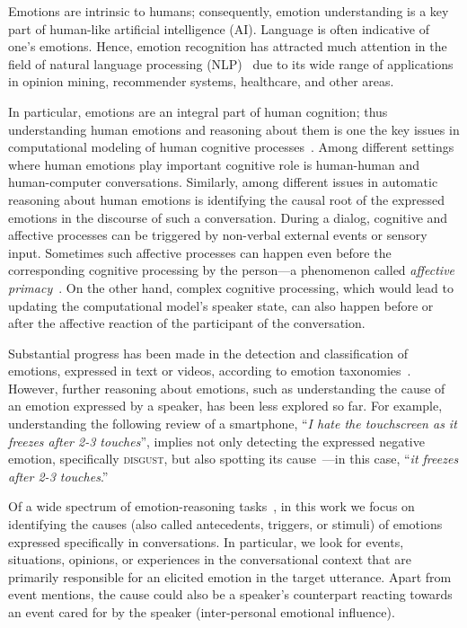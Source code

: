 \documentclass[smallextended]{svjour3}
\newcommand\emo[1]{\textsc{#1}}
\newcommand\0{\hphantom{0}}
\begin{document}
Emotions are intrinsic to humans; consequently,
emotion understanding is a key part of human-like artificial
intelligence (AI). Language is
often indicative of one's emotions. Hence, emotion recognition has attracted much attention 
in the field of natural language processing (NLP)~\citep{kratzwald2018decision, colneric2018emotion} due to its wide range of applications in
opinion mining, recommender systems, healthcare, and other areas.

In particular, emotions are an integral part of human cognition; thus understanding human emotions and reasoning about them is one the key issues in computational modeling of human cognitive processes~\citep{Izard1992}. Among different settings where human emotions play important cognitive role is human-human and human-computer conversations. Similarly, among different issues in automatic reasoning about human emotions is identifying the causal root of the expressed emotions in the discourse of such a conversation.
During a dialog, cognitive and affective processes can be triggered by non-verbal external events or sensory input. Sometimes such affective processes can happen even before the corresponding cognitive processing by the person---a phenomenon called \emph{affective primacy}~\citep{Zajonc80feelingand}. On the other hand, complex cognitive processing, which would lead to updating the computational model's speaker state, can also happen before or after the affective reaction of the participant of the conversation. 


Substantial progress has been made in the detection and classification of emotions, expressed in text or videos, according to emotion taxonomies~\cite{ekman1993facial,plutchik}. However, further reasoning about emotions, such as  
understanding the cause of an emotion expressed by a speaker,
has been less explored so far.
For example, 
understanding
the following review of a smartphone, ``\textit{I hate the touchscreen as it freezes after 2-3 touches}'',
implies not only detecting the expressed negative emotion, specifically \emo{disgust}, but also spotting its cause~\citep{liu2012sentiment}---in this case, ``\textit{it freezes after 2-3 touches}.''






Of a wide spectrum of emotion-reasoning tasks~\cite{ellsworth2003appraisal},
in this work we focus on identifying the causes (also called antecedents, triggers, or stimuli) of emotions expressed specifically in conversations. In particular, we look for events, situations, opinions, or experiences in the conversational context that are primarily responsible for an elicited emotion in the target utterance. Apart from event mentions, the cause could also be a speaker's counterpart reacting towards an event cared for by the speaker (inter-personal emotional influence). 
\end{document}

